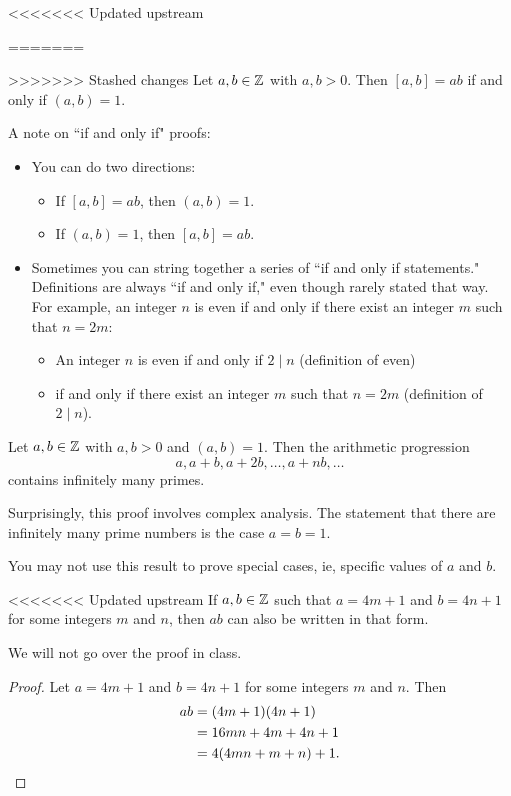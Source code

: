 \documentclass{ximera}
\begin{document}
<<<<<<< Updated upstream
\begin{corollary}[Corollary 1.20]\label{cor:lcm-gcd}
=======
\begin{corollary}\label{cor:lcm-gcd}
>>>>>>> Stashed changes
 Let $a,b\in\mathbb Z$ with $a,b>0$. Then $[a,b]=ab$ if and only if $(a,b)=1$.
\end{corollary}
A note on ``if and only if" proofs: 
\begin{itemize}
 \item You can do two directions: 
\begin{itemize}
 \item  If $[a,b]=ab$, then $(a,b)=1$.
 \item  If $(a,b)=1$, then $[a,b]=ab$.
\end{itemize}
\item Sometimes you can string together a series of ``if and only if statements." Definitions are always ``if and only if," even though rarely stated that way. For example, an integer $n$ is even if and only if there exist an integer $m$ such that $n=2m$:
\begin{itemize}
 \item An integer $n$ is even if and only if $2\mid n$ (definition of even) 
 \item if and only if there exist an integer $m$ such that $n=2m$ (definition of $2\mid n$).
\end{itemize}
\end{itemize}

\begin{theorem}\label{thm:dirichlet}
 Let $a,b\in\mathbb Z$ with $a,b>0$ and $(a,b)=1$. Then the arithmetic progression \[a,a+b, a+2b, \dots, a+nb,\dots\]
 contains infinitely many primes.
\end{theorem}
Surprisingly, this proof involves complex analysis. The statement that there are infinitely many prime numbers is the case $a=b=1$.


\begin{warning}
    You may not use this result to prove special cases, ie, specific values of $a$ and $b$.
\end{warning}


\begin{lemma}[Lemma 1.23]\label{lem:prod-goodprimes}
<<<<<<< Updated upstream
 If $a,b\in\mathbb Z$ such that $a=4m+1$ and $b=4n+1$ for some integers $m$ and $n$, then $ab$ can also be written in that form.
\end{lemma}
We will not go over the proof in class.
\begin{proof}
 Let $a=4m+1$ and $b=4n+1$ for some integers $m$ and $n$. Then 
\begin{align*}
ab&=(4m+1)(4n+1)\\
&=16mn+4m+4n+1\\
&=4(4mn+m+n)+1.\qedhere
\end{align*}
\end{proof}


\end{corollary}
\end{document}
